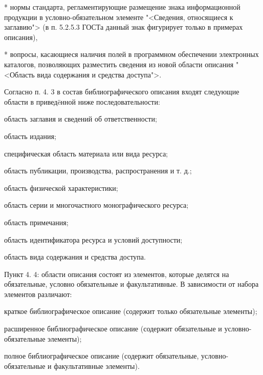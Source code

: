 * нормы стандарта, регламентирующие размещение знака информационной продукции в условно-обязательном элементе "<Сведения, относящиеся к заглавию"> (в п. 5.2.5.3 ГОСТа данный знак фигурирует только в примерах описания),

* вопросы, касающиеся наличия полей в программном обеспечении электронных каталогов, позволяющих разместить сведения из новой области описания "<Область вида содержания и средства доступа">.

\vspace{2cm}


Согласно п. 4. 3 в состав библиографического описания входят следующие области в привед\"eнной ниже последовательности:

\begin{cutelist}
    \item область заглавия и сведений об ответственности;
    \item область издания;
    \item специфическая область материала или вида ресурса;
    \item область публикации, производства, распространения и т. д.;
    \item область физической характеристики;
    \item область серии и многочастного монографического ресурса;
    \item область примечания;
    \item область идентификатора ресурса и условий доступности;
    \item область вида содержания и средства доступа.
\end{cutelist}

Пункт 4. 4: области описания состоят из элементов, которые делятся на обязательные, условно обязательные и факультативные. В зависимости от набора элементов различают:

\begin{cutelist}
    \item краткое библиографическое описание (содержит только обязательные элементы);
    \item расширенное библиографическое описание (содержит обязательные и условно-обязательные элементы);
    \item полное библиографическое описание (содержит обязательные, ус\-лов\-но-обязательные и факультативные элементы).
\end{cutelist}

